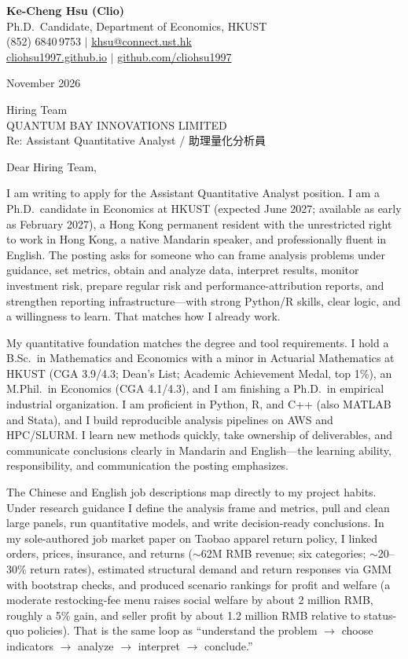 \documentclass[11pt,letterpaper]{article}
\begin{document}
\noindent
{\bfseries Ke-Cheng Hsu (Clio)}\\
Ph.D.\ Candidate, Department of Economics, HKUST\\
(852) 6840\,9753 \quad $|$ \quad \href{mailto:khsu@connect.ust.hk}{khsu@connect.ust.hk}\\
\href{https://cliohsu1997.github.io/}{cliohsu1997.github.io} \quad $|$ \quad \href{https://github.com/cliohsu1997}{github.com/cliohsu1997}

\vspace{0.3em}
 November 2026

\vspace{0.2em}
\noindent
Hiring Team\\
QUANTUM BAY INNOVATIONS LIMITED\\
Re: Assistant Quantitative Analyst / 助理量化分析員

\vspace{0.1em}
Dear Hiring Team,

I am writing to apply for the Assistant Quantitative Analyst position. I am a Ph.D.\ candidate in Economics at HKUST (expected June 2027; available as early as February 2027), a Hong Kong permanent resident with the unrestricted right to work in Hong Kong, a native Mandarin speaker, and professionally fluent in English. The posting asks for someone who can frame analysis problems under guidance, set metrics, obtain and analyze data, interpret results, monitor investment risk, prepare regular risk and performance-attribution reports, and strengthen reporting infrastructure---with strong Python/R skills, clear logic, and a willingness to learn. That matches how I already work.

My quantitative foundation matches the degree and tool requirements. I hold a B.Sc.\ in Mathematics and Economics with a minor in Actuarial Mathematics at HKUST (CGA 3.9/4.3; Dean's List; Academic Achievement Medal, top 1\%), an M.Phil.\ in Economics (CGA 4.1/4.3), and I am finishing a Ph.D.\ in empirical industrial organization. I am proficient in Python, R, and C++ (also MATLAB and Stata), and I build reproducible analysis pipelines on AWS and HPC/SLURM. I learn new methods quickly, take ownership of deliverables, and communicate conclusions clearly in Mandarin and English---the learning ability, responsibility, and communication the posting emphasizes.

The Chinese and English job descriptions map directly to my project habits. Under research guidance I define the analysis frame and metrics, pull and clean large panels, run quantitative models, and write decision-ready conclusions. In my sole-authored job market paper on Taobao apparel return policy, I linked orders, prices, insurance, and returns (\(\sim\)62M RMB revenue; six categories; \(\sim\)20--30\% return rates), estimated structural demand and return responses via GMM with bootstrap checks, and produced scenario rankings for profit and welfare (a moderate restocking-fee menu raises social welfare by about 2 million RMB, roughly a 5\% gain, and seller profit by about 1.2 million RMB relative to status-quo policies). That is the same loop as ``understand the problem \(\rightarrow\) choose indicators \(\rightarrow\) analyze \(\rightarrow\) interpret \(\rightarrow\) conclude.''
\end{document}

